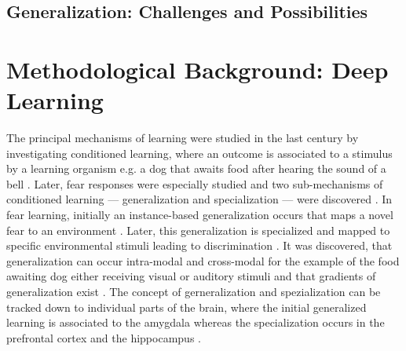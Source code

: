 


    \subsection{Generalization: Challenges and Possibilities} %


\section{Methodological Background: Deep Learning} %
    The principal mechanisms of learning were studied in the last century by investigating conditioned learning, where an outcome is associated to a stimulus by a learning organism e.g. a dog that awaits food after hearing the sound of a bell \citep{pavlov1928conditioned, pavlov2010conditioned, banich2011generalization}. Later, fear responses were especially studied and two sub-mechanisms of conditioned learning --- generalization and specialization --- were discovered \citep{banich2011generalization}.
    In fear learning, initially an instance-based generalization occurs that maps a novel fear to an environment \citep{banich2011generalization}. Later, this generalization is specialized and mapped to specific environmental stimuli leading to discrimination \citep{banich2011generalization}.
    It was discovered, that generalization can occur intra-modal and cross-modal for the example of the food awaiting dog either receiving visual or auditory stimuli \citep{pavlov1928conditioned} and that gradients of generalization exist \citep{guttman1956discriminability}.
    The concept of gerneralization and spezialization can be tracked down to individual parts of the brain, where the initial generalized learning is associated to the amygdala whereas the specialization occurs in the prefrontal cortex and the hippocampus \citep{banich2011generalization}.

